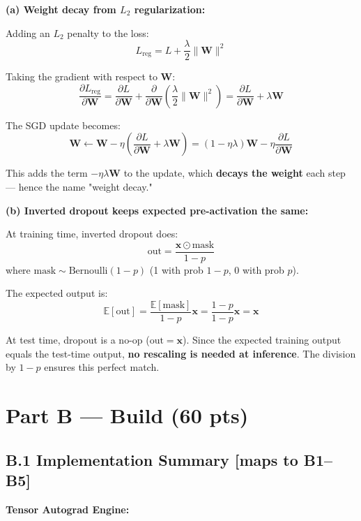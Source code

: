 \documentclass[11pt,a4paper]{article}
\begin{document}
\textbf{(a) Weight decay from $L_2$ regularization:}

Adding an $L_2$ penalty to the loss:
\[
L_{\text{reg}} = L + \frac{\lambda}{2}\|\mathbf{W}\|^2
\]

Taking the gradient with respect to $\mathbf{W}$:
\[
\frac{\partial L_{\text{reg}}}{\partial \mathbf{W}} = \frac{\partial L}{\partial \mathbf{W}} + \frac{\partial}{\partial \mathbf{W}}\left(\frac{\lambda}{2}\|\mathbf{W}\|^2\right)
= \frac{\partial L}{\partial \mathbf{W}} + \lambda \mathbf{W}
\]

The SGD update becomes:
\[
\mathbf{W} \leftarrow \mathbf{W} - \eta\left(\frac{\partial L}{\partial \mathbf{W}} + \lambda \mathbf{W}\right)
= (1 - \eta\lambda)\mathbf{W} - \eta\frac{\partial L}{\partial \mathbf{W}}
\]

This adds the term $-\eta\lambda \mathbf{W}$ to the update, which \textbf{decays the weight} each step — hence the name "weight decay."

\textbf{(b) Inverted dropout keeps expected pre-activation the same:}

At training time, inverted dropout does:
\[
\text{out} = \frac{\mathbf{x} \odot \text{mask}}{1-p}
\]
where $\text{mask} \sim \text{Bernoulli}(1-p)$ (1 with prob $1-p$, 0 with prob $p$).

The expected output is:
\[
\mathbb{E}[\text{out}] = \frac{\mathbb{E}[\text{mask}]}{1-p}\mathbf{x}
= \frac{1-p}{1-p}\mathbf{x}
= \mathbf{x}
\]

At test time, dropout is a no-op ($\text{out} = \mathbf{x}$). Since the expected training output equals the test-time output, \textbf{no rescaling is needed at inference}. The division by $1-p$ ensures this perfect match.

\section{Part B --- Build (60 pts)}

\subsection*{B.1 Implementation Summary \hfill [maps to B1--B5]}

\textbf{Tensor Autograd Engine:}
\end{document}

